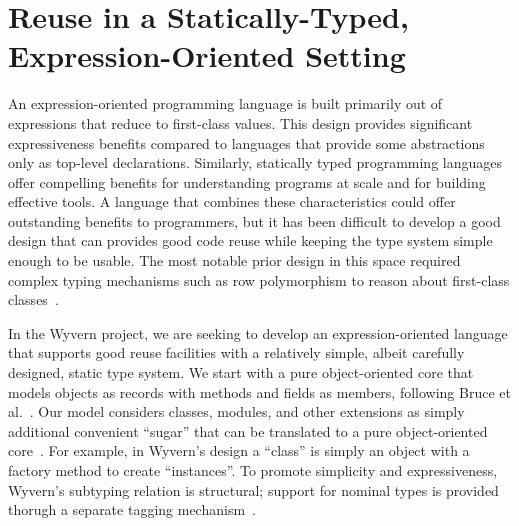 \documentclass[preprint,10pt]{sigplanconf}
\begin{document}

%


\section{Reuse in a Statically-Typed, Expression-Oriented Setting}

An expression-oriented programming language is built primarily out of
expressions that reduce to first-class values.  This design provides
significant expressiveness benefits compared to languages that provide
some abstractions only as top-level declarations.  Similarly, statically
typed programming languages offer compelling benefits for understanding
programs at scale and for building effective tools.  A language that
combines these characteristics could offer outstanding benefits to
programmers, but it has been difficult to develop a good design that
can provides good code reuse while keeping
the type system simple enough to be usable.  The most notable prior
design in this space required complex typing mechanisms such as row
polymorphism to reason about first-class classes~\cite{TSDTF}.


In the Wyvern project, we are seeking to develop an expression-oriented
language that supports good reuse facilities with a relatively simple,
albeit carefully designed, static type system.  We start with a pure
object-oriented core that models objects as records with methods and
fields as members, following Bruce et al.~\cite{BCP99}. Our model
considers classes, modules, and other extensions as simply additional
convenient ``sugar'' that can be translated to a pure object-oriented
core~\cite{Nistor:2013:WST:2489828.2489830}.  For example, in Wyvern's
design a ``class'' is simply an object with a factory method to create
``instances''.  To promote simplicity and expressiveness, Wyvern's
subtyping relation is structural; support for nominal types is
provided thorugh a separate tagging
mechanism~\cite{DBLP:conf/ecoop/LeeASP15}.
\end{document}
